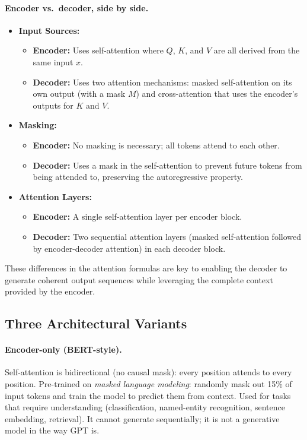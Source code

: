 \documentclass[11pt]{article}
\theoremstyle{remark}
\begin{document}
\paragraph{Encoder vs.\ decoder, side by side.}
\begin{itemize}[noitemsep]
    \item \textbf{Input Sources:}
    \begin{itemize}[noitemsep]
        \item \textbf{Encoder:} Uses self-attention where \( Q \), \( K \), and \( V \) are all derived from the same input \( x \).
        \item \textbf{Decoder:} Uses two attention mechanisms: masked self-attention on its own output (with a mask \( M \)) and cross-attention that uses the encoder's outputs for \( K \) and \( V \).
    \end{itemize}
    \item \textbf{Masking:}
    \begin{itemize}[noitemsep]
        \item \textbf{Encoder:} No masking is necessary; all tokens attend to each other.
        \item \textbf{Decoder:} Uses a mask in the self-attention to prevent future tokens from being attended to, preserving the autoregressive property.
    \end{itemize}
    \item \textbf{Attention Layers:}
    \begin{itemize}[noitemsep]
        \item \textbf{Encoder:} A single self-attention layer per encoder block.
        \item \textbf{Decoder:} Two sequential attention layers (masked self-attention followed by encoder-decoder attention) in each decoder block.
    \end{itemize}
\end{itemize}
These differences in the attention formulas are key to enabling the decoder to generate coherent output sequences while leveraging the complete context provided by the encoder.

\subsection{Three Architectural Variants}

\paragraph{Encoder-only (BERT-style).}
Self-attention is bidirectional (no causal mask): every position attends to every position. Pre-trained on \emph{masked language modeling}: randomly mask out 15\% of input tokens and train the model to predict them from context. Used for tasks that require understanding (classification, named-entity recognition, sentence embedding, retrieval). It cannot generate sequentially; it is not a generative model in the way GPT is.
\end{document}

